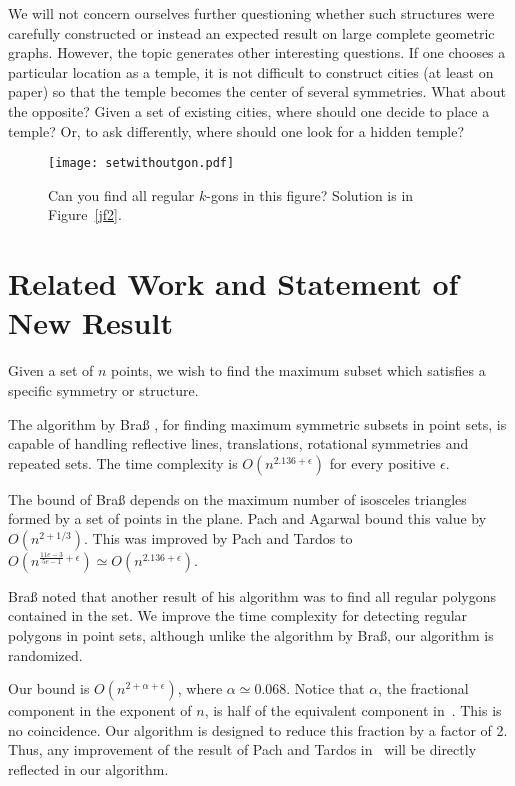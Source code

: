 \documentclass{article}
\begin{document}
We will not concern ourselves further questioning whether such structures were
carefully constructed or instead an expected result on large complete geometric
graphs.  However, the topic generates other interesting questions.
If one chooses a particular location as a temple, it is not 
difficult to construct cities (at least on paper)
so that the temple becomes the center of several symmetries.
What about the opposite?  Given a set of existing cities, where should one decide
to place a temple?  Or, to ask differently, where should one look for a hidden
temple?
\begin{figure}[t!]
\center\texttt{[image: setwithoutgon.pdf]}
\caption{Can you find all regular $k$-gons in this figure? Solution
is in Figure~\ref{jf2}.}
\label{jf1}
\end{figure}

\section{Related Work and Statement of New Result}
\label{previous}

Given a set of $n$ points, we wish to find the maximum subset which satisfies
a specific symmetry or structure.

The algorithm by Bra{\ss} \cite{brass}, for 
finding maximum symmetric subsets in point sets, is capable of
handling reflective lines, translations, rotational symmetries and repeated sets.
The time complexity is $O(n^{2.136{+}\epsilon})$ for every positive $\epsilon$.


The bound of Bra{\ss} depends on the maximum number of
isosceles triangles formed by a set of points in the plane. Pach and
Agarwal \cite{pachagarwal} bound this value by $O(n^{2{+}1/3})$. 
This was improved by Pach and Tardos
\cite{pach} to $O(n^{\frac{11e{-}3}{5e{-}1}{+}\epsilon}) \simeq O(n^{2.136{+}\epsilon})$.

Bra{\ss} noted that another result of his algorithm
 was to find all regular polygons contained in the set.
We improve the time complexity for detecting regular polygons in point
sets, although unlike the algorithm by Bra{\ss}, our algorithm is randomized.

Our  bound is $O(n^{2{+}\alpha+\epsilon})$, where $\alpha{\simeq}0.068$.
Notice that $\alpha$, the fractional component in the exponent of $n$, is half of the equivalent
component in~\cite{brass}. This is no coincidence.
Our algorithm is designed to reduce this fraction by a factor of 2.
Thus, any improvement of the result of Pach and Tardos in~\cite{pach} will be directly
reflected in our algorithm.
\end{document}
